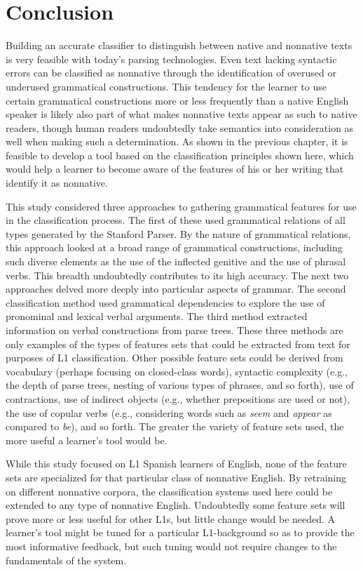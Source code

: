 \documentclass[main.tex]{subfiles}
\begin{document}
\section{Conclusion}
\setcounter{section}{9}

Building an accurate classifier to distinguish between native and nonnative texts is very feasible with today's parsing technologies. Even text lacking syntactic errors can be classified as nonnative through the identification of overused or underused grammatical constructions. This tendency for the learner to use certain grammatical constructions more or less frequently than a native English speaker is likely also part of what makes nonnative texts appear as such to native readers, though human readers undoubtedly take semantics into consideration as well when making such a determination. As shown in the previous chapter, it is feasible to develop a tool based on the classification principles shown here, which would help a learner to become aware of the features of his or her writing that identify it as nonnative.

This study considered three approaches to gathering grammatical features for use in the classification process. The first of these used grammatical relations of all types generated by the Stanford Parser. By the nature of grammatical relations, this approach looked at a broad range of grammatical constructions, including such diverse elements as the use of the inflected genitive and the use of phrasal verbs. This breadth undoubtedly contributes to its high accuracy. The next two approaches delved more deeply into particular aspects of grammar. The second classification method used grammatical dependencies to explore the use of pronominal and lexical verbal arguments. The third method extracted information on verbal constructions from parse trees. These three methods are only examples of the types of features sets that could be extracted from text for purposes of L1 classification. Other possible feature sets could be derived from vocabulary (perhaps focusing on closed-class words), syntactic complexity (e.g., the depth of parse trees, nesting of various types of phrases, and so forth), use of contractions, use of indirect objects (e.g., whether prepositions are used or not), the use of copular verbs (e.g., considering words such as \textit{seem} and \textit{appear} as compared to \textit{be}), and so forth. The greater the variety of feature sets used, the more useful a learner's tool would be.

While this study focused on L1 Spanish learners of English, none of the feature sets are specialized for that particular class of nonnative English. By retraining on different nonnative corpora, the classification systems used here could be extended to any type of nonnative English. Undoubtedly some feature sets will prove more or less useful for other L1s, but little change would be needed. A learner's tool might be tuned for a particular L1-background so as to provide the most informative feedback, but such tuning would not require changes to the fundamentals of the system.
\end{document}
